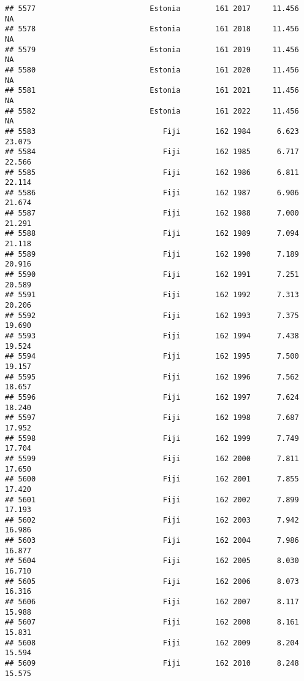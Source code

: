 \documentclass[
]{article}
\begin{document}
\begin{verbatim}
## 5577                          Estonia        161 2017     11.456         NA
## 5578                          Estonia        161 2018     11.456         NA
## 5579                          Estonia        161 2019     11.456         NA
## 5580                          Estonia        161 2020     11.456         NA
## 5581                          Estonia        161 2021     11.456         NA
## 5582                          Estonia        161 2022     11.456         NA
## 5583                             Fiji        162 1984      6.623     23.075
## 5584                             Fiji        162 1985      6.717     22.566
## 5585                             Fiji        162 1986      6.811     22.114
## 5586                             Fiji        162 1987      6.906     21.674
## 5587                             Fiji        162 1988      7.000     21.291
## 5588                             Fiji        162 1989      7.094     21.118
## 5589                             Fiji        162 1990      7.189     20.916
## 5590                             Fiji        162 1991      7.251     20.589
## 5591                             Fiji        162 1992      7.313     20.206
## 5592                             Fiji        162 1993      7.375     19.690
## 5593                             Fiji        162 1994      7.438     19.524
## 5594                             Fiji        162 1995      7.500     19.157
## 5595                             Fiji        162 1996      7.562     18.657
## 5596                             Fiji        162 1997      7.624     18.240
## 5597                             Fiji        162 1998      7.687     17.952
## 5598                             Fiji        162 1999      7.749     17.704
## 5599                             Fiji        162 2000      7.811     17.650
## 5600                             Fiji        162 2001      7.855     17.420
## 5601                             Fiji        162 2002      7.899     17.193
## 5602                             Fiji        162 2003      7.942     16.986
## 5603                             Fiji        162 2004      7.986     16.877
## 5604                             Fiji        162 2005      8.030     16.710
## 5605                             Fiji        162 2006      8.073     16.316
## 5606                             Fiji        162 2007      8.117     15.988
## 5607                             Fiji        162 2008      8.161     15.831
## 5608                             Fiji        162 2009      8.204     15.594
## 5609                             Fiji        162 2010      8.248     15.575

\end{verbatim}
\end{document}
